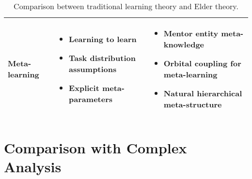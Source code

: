\begin{table}[h]
\begin{tabular}{|p{3cm}|p{5cm}|p{5cm}|}
\hline
Meta-learning & 
\begin{itemize}
    \item Learning to learn
    \item Task distribution assumptions
    \item Explicit meta-parameters
\end{itemize} &
\begin{itemize}
    \item Mentor entity meta-knowledge
    \item Orbital coupling for meta-learning
    \item Natural hierarchical meta-structure
\end{itemize} \\
\hline
\end{tabular}
\caption{Comparison between traditional learning theory and Elder theory.}
\label{tab:learning_comparison}
\end{table}

\section{Comparison with Complex Analysis}


